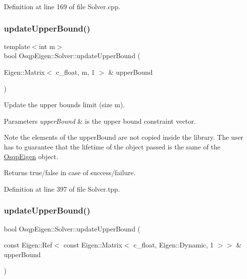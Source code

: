 Definition at line 169 of file Solver.\+cpp.

\mbox{\label{classOsqpEigen_1_1Solver_a69f1db45e10dae9c186cc0561532f018}} 
\subsubsection{\texorpdfstring{update\+Upper\+Bound()}{updateUpperBound()}\hspace{0.1cm}{\footnotesize\ttfamily [1/2]}}
{\footnotesize\ttfamily template$<$int m$>$ \\
bool Osqp\+Eigen\+::\+Solver\+::update\+Upper\+Bound (\begin{DoxyParamCaption}\item[{Eigen\+::\+Matrix$<$ c\+\_\+float, m, 1 $>$ \&}]{upper\+Bound }\end{DoxyParamCaption})}



Update the upper bounds limit (size m). 


\begin{DoxyParams}{Parameters}
{\em upper\+Bound} & is the upper bound constraint vector. \\
\hline
\end{DoxyParams}
\begin{DoxyNote}{Note}
the elements of the upper\+Bound are not copied inside the library. The user has to guarantee that the lifetime of the object passed is the same of the \mbox{\hyperlink{namespaceOsqpEigen}{Osqp\+Eigen}} object. 
\end{DoxyNote}
\begin{DoxyReturn}{Returns}
true/false in case of success/failure. 
\end{DoxyReturn}


Definition at line 397 of file Solver.\+tpp.

\mbox{\label{classOsqpEigen_1_1Solver_aa944cadb9be917eb74c1d25bac65bc29}} 
\subsubsection{\texorpdfstring{update\+Upper\+Bound()}{updateUpperBound()}\hspace{0.1cm}{\footnotesize\ttfamily [2/2]}}
{\footnotesize\ttfamily bool Osqp\+Eigen\+::\+Solver\+::update\+Upper\+Bound (\begin{DoxyParamCaption}\item[{const Eigen\+::\+Ref$<$ const Eigen\+::\+Matrix$<$ c\+\_\+float, Eigen\+::\+Dynamic, 1 $>$$>$ \&}]{upper\+Bound }\end{DoxyParamCaption})}



